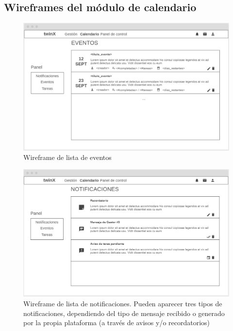 \subsection{Wireframes del módulo de calendario}

\begin{figure}
	\centering
	\includegraphics[width=\textwidth]{img/Wireframes/Calendario/eventos_lista.png}
	\caption{Wireframe de lista de eventos}
	\label{fig:eventos_listaWF}
\end{figure}

\begin{figure}
	\centering
	\includegraphics[width=\textwidth]{img/Wireframes/Calendario/notificaciones_lista.png}
	\caption[Wireframe de lista de notificaciones]{Wireframe de lista de notificaciones. Pueden aparecer tres tipos de notificaciones, dependiendo del tipo de mensaje recibido o generado por la propia plataforma (a través de avisos y/o recordatorios)}
	\label{fig:notificaciones_listaWF}
\end{figure}

